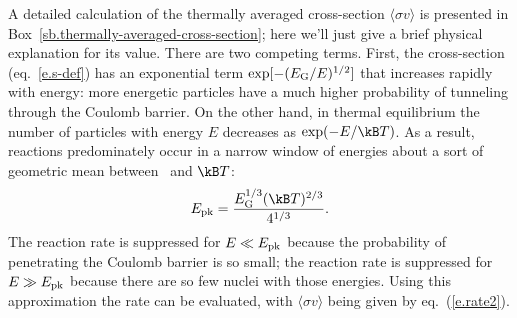 A detailed calculation of the thermally averaged cross-section $\langle\sigma v\rangle$ is presented in Box~\ref{sb.thermally-averaged-cross-section}; here we'll just give a brief physical explanation for its value. There are two competing terms. First, the cross-section (eq.~\ref{e.s-def}) has an exponential term $\exp[-(E_{\mathrm{G}}/E)^{1/2}]$ that increases rapidly with energy: more energetic particles have a much higher probability of tunneling through the Coulomb barrier. On the other hand, in thermal equilibrium the number of particles with energy $E$ decreases as $\exp(-E/\kB T)$.
As a result, reactions predominately occur in a narrow window of energies about a sort of geometric mean between \EG\ and $\kB T$:
\[	\Epk = \frac{\EG^{1/3}(\kB T)^{2/3}}{4^{1/3}}. \]
The reaction rate is suppressed for $E\ll E_{\mathrm{pk}}$ because the probability of penetrating the Coulomb barrier is so small; the reaction rate is suppressed for $E\gg E_{\mathrm{pk}}$ because there are so few nuclei with those energies. Using this approximation the rate can be evaluated, with $\langle\sigma v\rangle$ being given by eq.~(\ref{e.rate2}).

